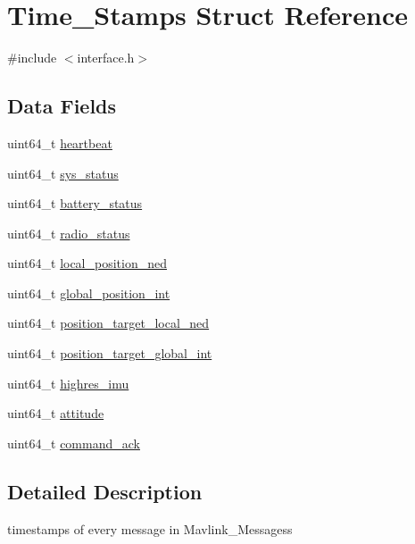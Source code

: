 \hypertarget{struct_time___stamps}{}\section{Time\+\_\+\+Stamps Struct Reference}
\label{struct_time___stamps}


{\ttfamily \#include $<$interface.\+h$>$}

\subsection*{Data Fields}
\begin{DoxyCompactItemize}
\item 
uint64\+\_\+t \hyperlink{struct_time___stamps_a0585817e699b46e384f5ccc2d122362a}{heartbeat}
\item 
uint64\+\_\+t \hyperlink{struct_time___stamps_a0c435af1e679e794a97d29f6ad8033c4}{sys\+\_\+status}
\item 
uint64\+\_\+t \hyperlink{struct_time___stamps_af6f0cc3b4549bdc74d9f5c3b01522877}{battery\+\_\+status}
\item 
uint64\+\_\+t \hyperlink{struct_time___stamps_a349d4b854b6448bec3938af7bb59a482}{radio\+\_\+status}
\item 
uint64\+\_\+t \hyperlink{struct_time___stamps_a39f9bcf43ad658301417a7aa3ae368bd}{local\+\_\+position\+\_\+ned}
\item 
uint64\+\_\+t \hyperlink{struct_time___stamps_a9bde3d252fe8abb20df512cfb8ed1879}{global\+\_\+position\+\_\+int}
\item 
uint64\+\_\+t \hyperlink{struct_time___stamps_a90cff6c62a9d017149d202852e3c7881}{position\+\_\+target\+\_\+local\+\_\+ned}
\item 
uint64\+\_\+t \hyperlink{struct_time___stamps_a6c9893fba620cfe3b8d8ff5ffd6a375b}{position\+\_\+target\+\_\+global\+\_\+int}
\item 
uint64\+\_\+t \hyperlink{struct_time___stamps_a05ee98180378af9ae38747893f5a4561}{highres\+\_\+imu}
\item 
uint64\+\_\+t \hyperlink{struct_time___stamps_ae5c3610ce264d2ccf7f529ae494ca474}{attitude}
\item 
uint64\+\_\+t \hyperlink{struct_time___stamps_aa52d5737fe1f692528b7ff03154399ea}{command\+\_\+ack}
\end{DoxyCompactItemize}


\subsection{Detailed Description}
timestamps of every message in Mavlink\+\_\+\+Messagess 

